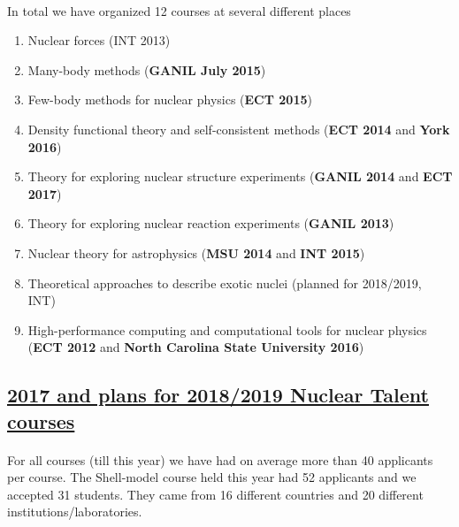 \documentclass[%
oneside,                 %
final,                   %
10pt]{article}
\begin{document}
\paragraph{}
In total we have organized 12 courses at several different places
\begin{enumerate}
\item Nuclear forces (INT 2013)

\item Many-body methods (\textbf{GANIL July 2015})

\item Few-body methods for nuclear physics (\textbf{ECT 2015})

\item Density functional theory and self-consistent methods (\textbf{ECT 2014} and \textbf{York 2016})

\item Theory for exploring nuclear structure experiments (\textbf{GANIL 2014} and \textbf{ECT 2017})

\item Theory for exploring nuclear reaction experiments (\textbf{GANIL 2013})

\item Nuclear theory for astrophysics (\textbf{MSU 2014} and \textbf{INT 2015})

\item Theoretical approaches to describe  exotic nuclei (planned for 2018/2019, INT)

\item High-performance computing and computational tools for nuclear physics (\textbf{ECT 2012} and \textbf{North Carolina State University 2016})
\end{enumerate}

\noindent




\subsection*{\href{{http://fribtheoryalliance.org/TALENT/courses/courses.php}}{2017 and plans for 2018/2019 Nuclear Talent courses}}

\paragraph{}
For all courses (till this year) we have had on average more than 40 applicants per course. The Shell-model course held this year had 52 applicants and we accepted 31 students. They came from 16 different countries and 20 different institutions/laboratories.
\end{document}
